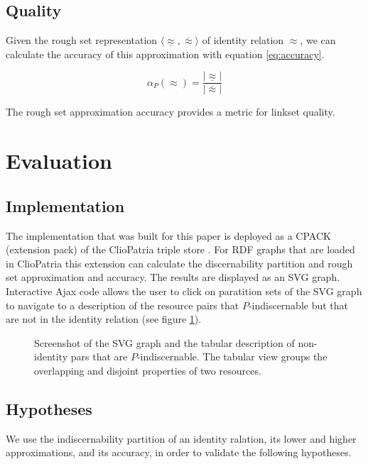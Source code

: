 \documentclass[letterpaper]{article}
\begin{document}
\subsection{Quality}

Given the rough set representation $\langle \underline{\approx}, \overline{\approx} \rangle$ of identity relation $\approx$, we can calculate the accuracy of this approximation with equation \ref{eq:accuracy}.

\begin{equation}
\label{eq:accuracy}
\alpha_P(\approx) = \frac{\vert \underline{\approx} \vert}{\vert \overline{\approx} \vert}
\end{equation}

The rough set approximation accuracy provides a metric for linkset quality.

\section{Evaluation}
\label{sec:evaluation}

\subsection{Implementation}
\label{sec:implementation}

The implementation that was built for this paper is deployed as a CPACK (extension pack) of the ClioPatria triple store \cite{schreiber_2006}. For RDF graphs that are loaded in ClioPatria this extension can calculate the discernability partition and rough set approximation and accuracy. The results are displayed as an SVG graph. Interactive Ajax code allows the user to click on paratition sets of the SVG graph to navigate to a description of the resource pairs that $P$-indiscernable but that are not in the identity relation (see figure \ref{fig:screenshot}).

\begin{figure}
\label{fig:screenshot}
\caption{Screenshot of the SVG graph and the tabular description of non-identity pars that are $P$-indiscernable. The tabular view groups the overlapping and disjoint properties of two resources.}
\end{figure}

\subsection{Hypotheses}
\label{sec:hypotheses}

We use the indiscernability partition of an identity ralation, its lower and higher approximations, and its accuracy, in order to validate the following hypotheses.
\end{document}
